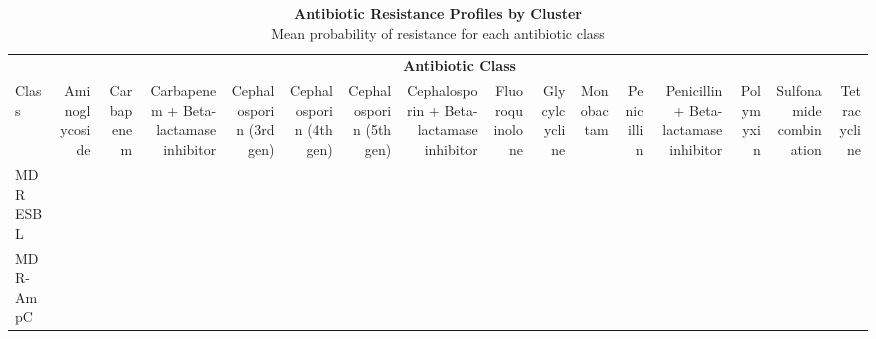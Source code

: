 \begin{table}[t]
\caption*{
{\large \textbf{Antibiotic Resistance Profiles by Cluster}} \\ 
{\small Mean probability of resistance for each antibiotic class}
} 
\fontsize{12.0pt}{14.4pt}\selectfont
\begin{tabular*}{\linewidth}{@{\extracolsep{\fill}}lrrrrrrrrrrrrrrr}
\toprule
 & \multicolumn{15}{c}{\textbf{Antibiotic Class}} \\ 
\cmidrule(lr){2-16}
Class & Aminoglycoside & Carbapenem & Carbapenem + Beta-lactamase inhibitor & Cephalosporin (3rd gen) & Cephalosporin (4th gen) & Cephalosporin (5th gen) & Cephalosporin + Beta-lactamase inhibitor & Fluoroquinolone & Glycylcycline & Monobactam & Penicillin & Penicillin + Beta-lactamase inhibitor & Polymyxin & Sulfonamide combination & Tetracycline \\ 
\midrule\addlinespace[2.5pt]
MDR ESBL & {\cellcolor[HTML]{A6B3BB}{\textcolor[HTML]{000000}{23.6\%}}} & {\cellcolor[HTML]{4575B4}{\textcolor[HTML]{FFFFFF}{0.1\%}}} & {\cellcolor[HTML]{4575B4}{\textcolor[HTML]{FFFFFF}{0.0\%}}} & {\cellcolor[HTML]{F5A372}{\textcolor[HTML]{000000}{74.1\%}}} & {\cellcolor[HTML]{FFE7AA}{\textcolor[HTML]{000000}{56.3\%}}} & {\cellcolor[HTML]{D73128}{\textcolor[HTML]{FFFFFF}{99.8\%}}} & {\cellcolor[HTML]{4675B4}{\textcolor[HTML]{FFFFFF}{0.2\%}}} & {\cellcolor[HTML]{F7F8BF}{\textcolor[HTML]{000000}{47.6\%}}} & {\cellcolor[HTML]{4675B4}{\textcolor[HTML]{FFFFFF}{0.2\%}}} & {\cellcolor[HTML]{E25A3D}{\textcolor[HTML]{FFFFFF}{92.1\%}}} & {\cellcolor[HTML]{D83429}{\textcolor[HTML]{FFFFFF}{99.4\%}}} & {\cellcolor[HTML]{8198B9}{\textcolor[HTML]{FFFFFF}{13.4\%}}} & {\cellcolor[HTML]{4B78B4}{\textcolor[HTML]{FFFFFF}{1.1\%}}} & {\cellcolor[HTML]{EF8A5E}{\textcolor[HTML]{000000}{80.6\%}}} & {\cellcolor[HTML]{7992B8}{\textcolor[HTML]{FFFFFF}{11.4\%}}} \\ 
MDR-AmpC & {\cellcolor[HTML]{758FB8}{\textcolor[HTML]{FFFFFF}{10.3\%}}} & {\cellcolor[HTML]{4B78B4}{\textcolor[HTML]{FFFFFF}{1.1\%}}} & {\cellcolor[HTML]{4A77B4}{\textcolor[HTML]{FFFFFF}{0.8\%}}} & {\cellcolor[HTML]{8298B9}{\textcolor[HTML]{FFFFFF}{13.6\%}}} & {\cellcolor[HTML]{4977B4}{\textcolor[HTML]{FFFFFF}{0.7\%}}} & {\cellcolor[HTML]{DDE1BE}{\textcolor[HTML]{000000}{39.8\%}}} & {\cellcolor[HTML]{4876B4}{\textcolor[HTML]{FFFFFF}{0.6\%}}} & {\cellcolor[HTML]{CBD1BD}{\textcolor[HTML]{000000}{34.4\%}}} & {\cellcolor[HTML]{4D79B5}{\textcolor[HTML]{FFFFFF}{1.5\%}}} & {\cellcolor[HTML]{4B78B4}{\textcolor[HTML]{FFFFFF}{1.0\%}}} & {\cellcolor[HTML]{D8362A}{\textcolor[HTML]{FFFFFF}{99.0\%}}} & {\cellcolor[HTML]{DEE2BE}{\textcolor[HTML]{000000}{40.0\%}}} & {\cellcolor[HTML]{557CB5}{\textcolor[HTML]{FFFFFF}{3.0\%}}} & {\cellcolor[HTML]{FBFBBF}{\textcolor[HTML]{000000}{48.7\%}}} & {\cellcolor[HTML]{F1F2BF}{\textcolor[HTML]{000000}{45.6\%}}} \\ 

\end{tabular*}
\end{table}
